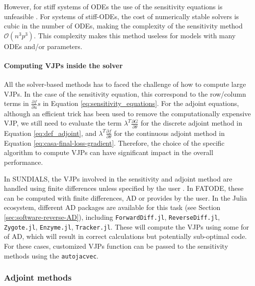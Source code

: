 However, for stiff systems of ODEs the use of the sensitivity equations is unfeasible \cite{kim_stiff_2021}.
For systems of stiff-ODEs, the cost of numerically stable solvers is cubic in the number of ODEs\cite{hairer-solving-2}, making the complexity of the sensitivity method $\mathcal{O}(n^3p^3)$. 
This complexity makes this method useless for models with many ODEs and/or parameters. 


\paragraph{Computing VJPs inside the solver}
\label{section:computing-vjp-inside-solver}

All the solver-based methods has to faced the challenge of how to compute large VJPs. 
In the case of the sensitivity equation, this correspond to the row/column terms in $\frac{\partial f}{\partial u} s $ in Equation \eqref{eq:sensitivity_equations}.
For the adjoint equations, although an efficient trick has been used to remove the computationally expensive VJP, we still need to evaluate the term $\lambda^T \frac{\partial G}{\partial \theta}$ for the discrete adjoint method in Equation \eqref{eq:def_adjoint}, and $\lambda^T \frac{\partial f}{\partial \theta}$ for the continuous adjoint method in Equation \eqref{eq:casa-final-loss-gradient}. 
Therefore, the choice of the specific algorithm to compute VJPs can have significant impact in the overall performance. 

In SUNDIALS, the VJPs involved in the sensitivity and adjoint method are handled using finite differences unless specified by the user \cite{SUNDIALS-hindmarsh2005sundials}.
In FATODE, these can be computed with finite differences, AD or provides by the user.
In the Julia ecosystem, different AD packages are available for this task (see Section \ref{sec:software-reverse-AD}), including \texttt{ForwardDiff.jl}, \texttt{ReverseDiff.jl}, \texttt{Zygote.jl}\cite{Innes_Zygote}, \texttt{Enzyme.jl}\cite{moses_Enzyme}, \texttt{Tracker.jl}.
These will compute the VJPs using some for of AD, which will result in correct calculations but potentially sub-optimal code. 
For these cases, customized VJPs function can be passed to the sensitivity methods using the \texttt{autojacvec}. 

\subsubsection{Adjoint methods}
\label{section:computing-adjoints}

